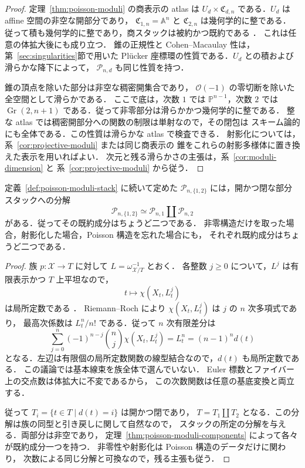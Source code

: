 \begin{proof}
定理~\ref{thm:poisson-moduli} の商表示の atlas は
$U_d\times\mathfrak C_{d,n}$ である．$U_d$ は affine 空間の非空な開部分であり，
$\mathfrak C_{1,n}=\mathbb A^n$ と $\mathfrak C_{2,n}$ は幾何学的に整である．
従って積も幾何学的に整であり，商スタックは被約かつ既約である
\cite[Tag 0DR5]{StacksProject}．
これは任意の体拡大後にも成り立つ．
錐の正規性と Cohen--Macaulay 性は，第~\ref{sec:singularities}節で用いた
Pl\"ucker 座標環の性質である．$U_d$ との積および滑らかな降下によって，
$\mathcal P_{n,d}$ も同じ性質を持つ．

錐の頂点を除いた部分は非空な稠密開集合であり，
$\mathcal O(-1)$ の零切断を除いた全空間として滑らかである．
ここで底は，次数 $1$ では $\mathbb P^{n-1}$，次数 $2$ では
$\operatorname{Gr}(2,n+1)$ である．従って非零部分は滑らかかつ幾何学的に整である．
整な atlas では稠密開部分への関数の制限は単射なので，その閉包は
スキーム論的にも全体である．この性質は滑らかな atlas で検査できる．
射影化については，系~\ref{cor:projective-moduli} または同じ商表示の
錐をこれらの射影多様体に置き換えた表示を用いればよい．
次元と残る滑らかさの主張は，系~\ref{cor:moduli-dimension} と
系~\ref{cor:projective-moduli} から従う．
\end{proof}

\begin{proposition}[次数の局所定数性と二つの成分]
\label{prop:poisson-degree-components}
定義~\ref{def:poisson-moduli-stack} に続いて定めた
$\mathcal P_{n,\{1,2\}}$ には，開かつ閉な部分スタックへの分解
\[
 \mathcal P_{n,\{1,2\}}\simeq
 \mathcal P_{n,1}\amalg\mathcal P_{n,2}
\]
がある．従ってその既約成分はちょうど二つである．
非零構造だけを取った場合，射影化した場合，Poisson 構造を忘れた場合にも，
それぞれ既約成分はちょうど二つである．
\end{proposition}

\begin{proof}
族 $p:\mathcal X\to T$ に対して $L=\omega_{\mathcal X/T}^{-1}$ とおく．
各整数 $j\ge0$ について，$L^j$ は有限表示かつ $T$ 上平坦なので，
\[
 t\longmapsto\chi(X_t,L_t^j)
\]
は局所定数である \cite[Tag 0B9T]{StacksProject}．
Riemann--Roch により $\chi(X_t,L_t^j)$ は $j$ の $n$ 次多項式であり，
最高次係数は $L_t^n/n!$ である．従って $n$ 次有限差分は
\[
 \sum_{j=0}^n(-1)^{n-j}\binom nj\chi(X_t,L_t^j)
 =L_t^n=(n-1)^n d(t)
\]
となる．左辺は有限個の局所定数関数の線型結合なので，$d(t)$ も局所定数である．
この議論では基本線束を族全体で選んでいない．
Euler 標数とファイバー上の交点数は体拡大に不変であるから，
この次数関数は任意の基底変換と両立する．

従って $T_i=\{t\in T\mid d(t)=i\}$ は開かつ閉であり，
$T=T_1\amalg T_2$ となる．この分解は族の同型と引き戻しに関して自然なので，
スタックの所定の分解を与える．両部分は非空であり，
定理~\ref{thm:poisson-moduli-components} によって各々が既約成分一つを持つ．
非零性や射影化は Poisson 構造のデータだけに関わり，
次数による同じ分解と可換なので，残る主張も従う．
\end{proof}

